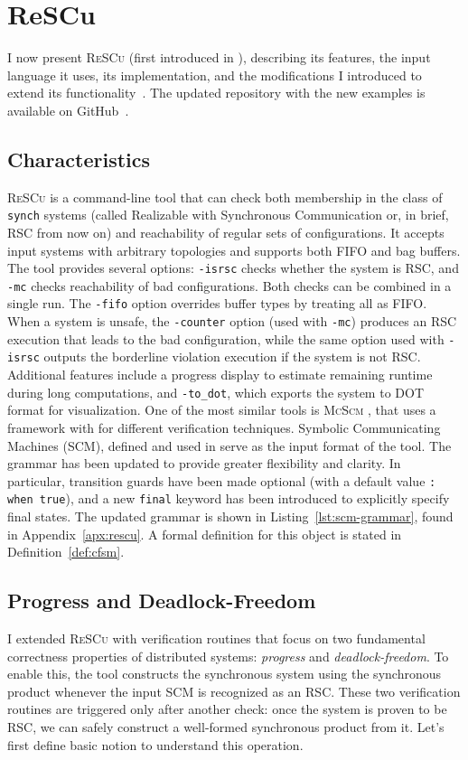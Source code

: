 \section{ReSCu}\label{sec:rescu}
I now present \textsc{ReSCu} (first introduced in \cite{desgeorges2023rsc, di2023multiparty, guizouarn2023communicating}),
describing its features, the input
language it uses, its implementation, and the modifications I introduced to
extend its functionality~\cite{rescuoriginalrepo}. The updated repository with 
the new examples is available on GitHub~\cite{rescurepo}.

\subsection{Characteristics}
\textsc{ReSCu} is a command-line tool that can check both membership in the 
class of \verb|synch| systems (called Realizable with Synchronous Communication 
or, in brief, RSC from now on) and reachability of regular sets of configurations. It 
accepts input systems with arbitrary topologies and supports both FIFO and 
bag buffers. The tool provides several options: 
\verb|-isrsc| checks whether the system is RSC, and \verb|-mc| checks reachability of 
bad configurations. Both checks can be combined in a single run. The \verb|-fifo| option 
overrides buffer types by treating all as FIFO. When a system is unsafe, the 
\verb|-counter| option (used with \verb|-mc|) produces an RSC execution that leads 
to the bad configuration, while the same option used with \verb|-isrsc| outputs the 
borderline violation execution if the system is not RSC. Additional features include 
a progress display to estimate remaining runtime during long computations, and 
\verb|-to_dot|, which exports the system to DOT format for visualization.
One of the most similar tools is \textsc{McScm} \cite{heussner2012mcscm}, that
uses a framework with for different verification techniques. 
Symbolic Communicating Machines (SCM), defined and used in \cite{brand1983communicating} 
serve as the input format of the tool.
The grammar has been updated to provide greater flexibility and clarity. In
particular, transition guards have been made optional (with a default value
\verb|: when true|), and a new \verb|final| keyword has been introduced to
explicitly specify final states. The updated grammar is shown in
Listing~\ref{lst:scm-grammar}, found in Appendix~\ref{apx:rescu}. 
A formal definition for this object is stated
in Definition~\ref{def:cfsm}.

\subsection{Progress and Deadlock-Freedom}
I extended \textsc{ReSCu} with verification routines that focus on two
fundamental correctness properties of distributed systems: \emph{progress} and
\emph{deadlock-freedom}. To enable this, the tool constructs the synchronous
system using the synchronous product whenever the input SCM is recognized as an
RSC. These two verification routines are triggered only after another check: 
once the system is proven to be RSC, we can safely construct a well-formed 
synchronous product from it. Let's first define basic notion to understand this operation.

